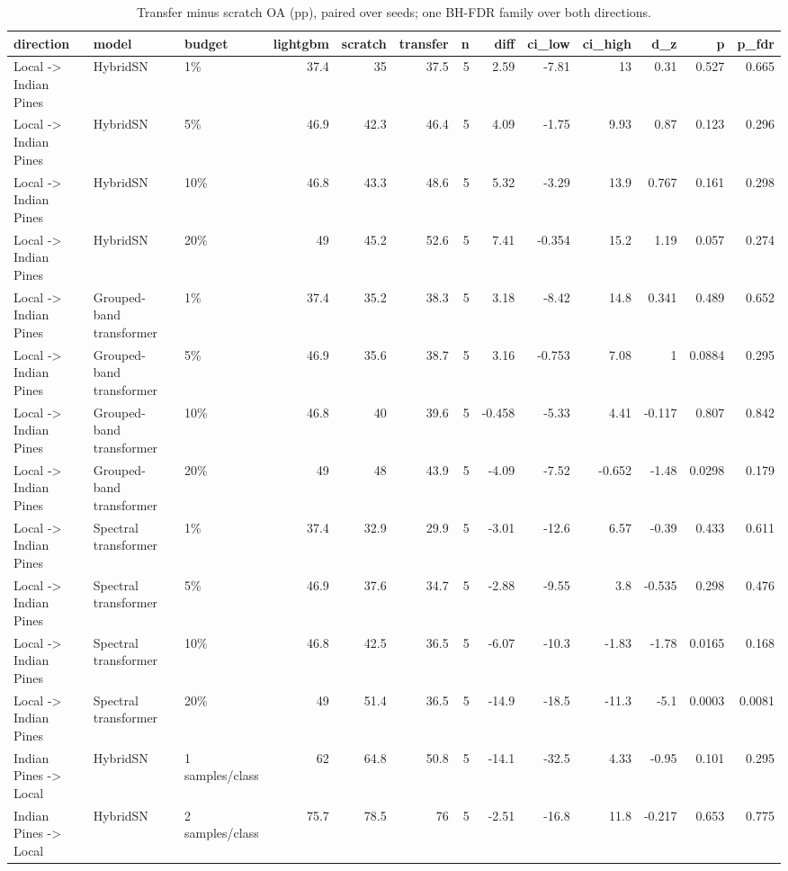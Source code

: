 \begin{table}
\caption{Transfer minus scratch OA (pp), paired over seeds; one BH-FDR family over both directions.}
\label{tab:stats_transfer}
\begin{tabular}{lllrrrrrrrrrr}
\toprule
direction & model & budget & lightgbm & scratch & transfer & n & diff & ci\_low & ci\_high & d\_z & p & p\_fdr \\
\midrule
Local -> Indian Pines & HybridSN & 1\% & 37.4 & 35 & 37.5 & 5 & 2.59 & -7.81 & 13 & 0.31 & 0.527 & 0.665 \\
Local -> Indian Pines & HybridSN & 5\% & 46.9 & 42.3 & 46.4 & 5 & 4.09 & -1.75 & 9.93 & 0.87 & 0.123 & 0.296 \\
Local -> Indian Pines & HybridSN & 10\% & 46.8 & 43.3 & 48.6 & 5 & 5.32 & -3.29 & 13.9 & 0.767 & 0.161 & 0.298 \\
Local -> Indian Pines & HybridSN & 20\% & 49 & 45.2 & 52.6 & 5 & 7.41 & -0.354 & 15.2 & 1.19 & 0.057 & 0.274 \\
Local -> Indian Pines & Grouped-band transformer & 1\% & 37.4 & 35.2 & 38.3 & 5 & 3.18 & -8.42 & 14.8 & 0.341 & 0.489 & 0.652 \\
Local -> Indian Pines & Grouped-band transformer & 5\% & 46.9 & 35.6 & 38.7 & 5 & 3.16 & -0.753 & 7.08 & 1 & 0.0884 & 0.295 \\
Local -> Indian Pines & Grouped-band transformer & 10\% & 46.8 & 40 & 39.6 & 5 & -0.458 & -5.33 & 4.41 & -0.117 & 0.807 & 0.842 \\
Local -> Indian Pines & Grouped-band transformer & 20\% & 49 & 48 & 43.9 & 5 & -4.09 & -7.52 & -0.652 & -1.48 & 0.0298 & 0.179 \\
Local -> Indian Pines & Spectral transformer & 1\% & 37.4 & 32.9 & 29.9 & 5 & -3.01 & -12.6 & 6.57 & -0.39 & 0.433 & 0.611 \\
Local -> Indian Pines & Spectral transformer & 5\% & 46.9 & 37.6 & 34.7 & 5 & -2.88 & -9.55 & 3.8 & -0.535 & 0.298 & 0.476 \\
Local -> Indian Pines & Spectral transformer & 10\% & 46.8 & 42.5 & 36.5 & 5 & -6.07 & -10.3 & -1.83 & -1.78 & 0.0165 & 0.168 \\
Local -> Indian Pines & Spectral transformer & 20\% & 49 & 51.4 & 36.5 & 5 & -14.9 & -18.5 & -11.3 & -5.1 & 0.0003 & 0.0081 \\
Indian Pines -> Local & HybridSN & 1 samples/class & 62 & 64.8 & 50.8 & 5 & -14.1 & -32.5 & 4.33 & -0.95 & 0.101 & 0.295 \\
Indian Pines -> Local & HybridSN & 2 samples/class & 75.7 & 78.5 & 76 & 5 & -2.51 & -16.8 & 11.8 & -0.217 & 0.653 & 0.775 \\

\end{tabular}
\end{table}
